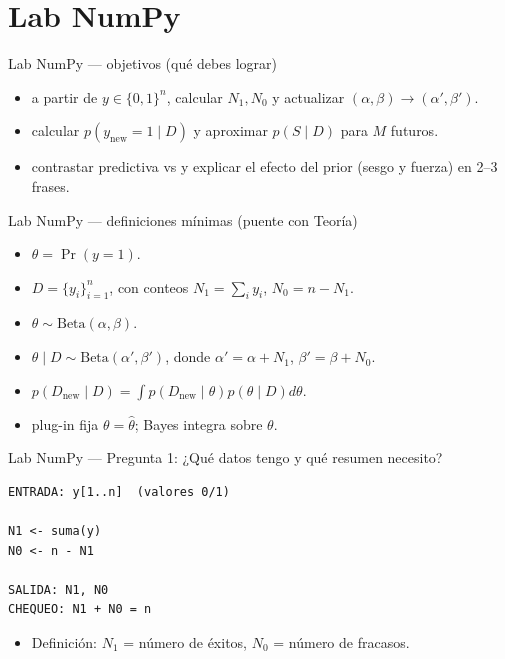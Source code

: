 \section[Lab NumPy]{Lab NumPy\label{sec:labnumpy}}

\begin{frame}{Lab NumPy — objetivos (qué debes lograr)}

\begin{itemize}
  \item {} a partir de \(y\in\{0,1\}^n\), calcular \(N_1,N_0\) y actualizar
  \((\alpha,\beta)\rightarrow(\alpha',\beta')\).
  \item {} calcular \(p(y_{\text{new}}=1\mid D)\) y aproximar \(p(S\mid D)\) para \(M\) futuros.
  \item {} contrastar predictiva  vs  y explicar el efecto del prior
  (sesgo y fuerza) en 2--3 frases.
\end{itemize}
\end{frame}

\begin{frame}{Lab NumPy — definiciones mínimas (puente con Teoría)}
\begin{itemize}
  \item {} \(\theta=\Pr(y=1)\).
  \item {} \(D=\{y_i\}_{i=1}^n\), con conteos \(N_1=\sum_i y_i\), \(N_0=n-N_1\).
  \item {} \(\theta\sim\mathrm{Beta}(\alpha,\beta)\).
  \item {} \(\theta\mid D\sim\mathrm{Beta}(\alpha',\beta')\),
  donde \(\alpha'=\alpha+N_1\), \(\beta'=\beta+N_0\).
  \item {} \(p(D_{\text{new}}\mid D)=\int p(D_{\text{new}}\mid\theta)p(\theta\mid D)d\theta\).
  \item {} plug-in fija \(\theta=\hat\theta\); Bayes integra sobre \(\theta\).
\end{itemize}
\end{frame}

\begin{frame}[fragile]{Lab NumPy — Pregunta 1: ¿Qué datos tengo y qué resumen necesito?}

\begin{verbatim}
ENTRADA: y[1..n]  (valores 0/1)

N1 <- suma(y)
N0 <- n - N1

SALIDA: N1, N0
CHEQUEO: N1 + N0 = n
\end{verbatim}
\begin{itemize}
  \item Definición: \(N_1\) = número de éxitos, \(N_0\) = número de fracasos.
\end{itemize}
\end{frame}

